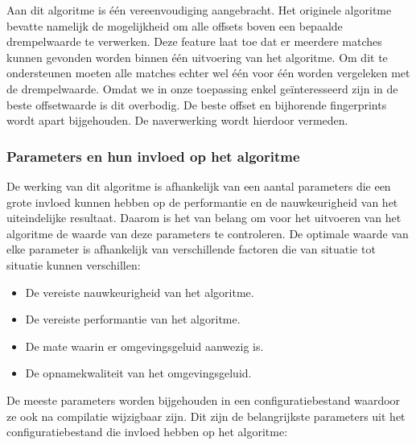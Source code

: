 Aan dit algoritme is één vereenvoudiging aangebracht. Het originele algoritme bevatte namelijk de mogelijkheid om alle offsets boven een bepaalde drempelwaarde te verwerken. Deze feature laat toe dat er meerdere matches kunnen gevonden worden binnen één uitvoering van het algoritme. Om dit te ondersteunen moeten alle matches echter wel één voor één worden vergeleken met de drempelwaarde. Omdat we in onze toepassing enkel geïnteresseerd zijn in de beste offsetwaarde is dit overbodig. De beste offset en bijhorende fingerprints wordt apart bijgehouden. De naverwerking wordt hierdoor vermeden.

\subsubsection{Parameters en hun invloed op het algoritme}
\label{accoustic-fingerprinting-params}

De werking van dit algoritme is afhankelijk van een aantal parameters die een grote invloed kunnen hebben op de performantie en de nauwkeurigheid van het uiteindelijke resultaat. Daarom is het van belang om voor het uitvoeren van het algoritme de waarde van deze parameters te controleren. De optimale waarde van elke parameter is afhankelijk van verschillende factoren die van situatie tot situatie kunnen verschillen:

\begin{itemize}[noitemsep]
\item De vereiste nauwkeurigheid van het algoritme.
\item De vereiste performantie van het algoritme.
\item De mate waarin er omgevingsgeluid aanwezig is.
\item De opnamekwaliteit van het omgevingsgeluid.
\end{itemize}

De meeste parameters worden bijgehouden in een configuratiebestand waardoor ze ook na compilatie wijzigbaar zijn. Dit zijn de belangrijkste parameters uit het configuratiebestand die invloed hebben op het algoritme:

